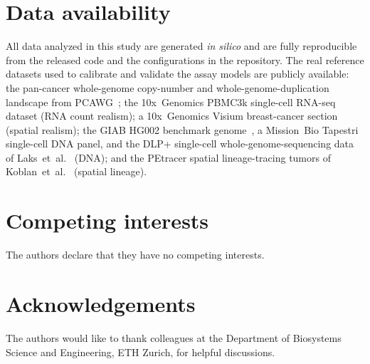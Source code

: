\documentclass{article}
\begin{document}
\section*{Data availability}
All data analyzed in this study are generated \emph{in silico} and are fully reproducible from the
released code and the configurations in the repository. The real reference datasets used to calibrate
and validate the assay models are publicly available: the pan-cancer whole-genome copy-number and
whole-genome-duplication landscape from PCAWG~\cite{pcawg_2020}; the 10x~Genomics PBMC3k single-cell
RNA-seq dataset (RNA count realism); a 10x~Genomics Visium breast-cancer section (spatial realism);
the GIAB HG002 benchmark genome~\cite{zook_giab_2019}, a Mission~Bio Tapestri single-cell DNA panel,
and the DLP+ single-cell whole-genome-sequencing data of Laks~et~al.~\cite{laks_dlp_2019} (DNA); and
the PEtracer spatial lineage-tracing tumors of Koblan~et~al.~\cite{koblan_petracer_2025} (spatial
lineage).

\section*{Competing interests}
The authors declare that they have no competing interests.

\section*{Acknowledgements}
The authors would like to thank colleagues at the Department of Biosystems Science and
Engineering, ETH Zurich, for helpful discussions.



\end{document}
